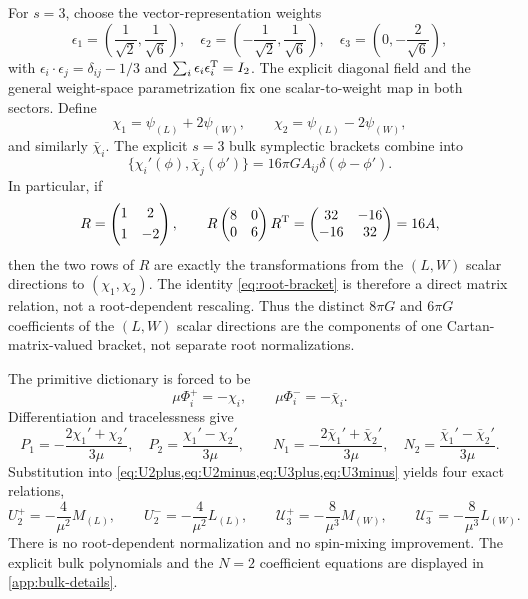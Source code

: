 \documentclass[11pt,a4paper]{article}
\numberwithin{equation}{section}
\theoremstyle{remark}
\newcommand{\cU}{\mathcal U}
\begin{document}
For $s=3$, choose the vector-representation weights
\begin{equation}
 \epsilon_1=\left(\frac1{\sqrt2},\frac1{\sqrt6}\right),\quad
 \epsilon_2=\left(-\frac1{\sqrt2},\frac1{\sqrt6}\right),\quad
 \epsilon_3=\left(0,-\frac2{\sqrt6}\right),
 \label{eq:A2-weights}
\end{equation}
with $\epsilon_i\cdot\epsilon_j=\delta_{ij}-1/3$ and
$\sum_i\epsilon_i\epsilon_i^{\rm T}=I_2$.  The explicit diagonal field and the general
weight-space parametrization fix one scalar-to-weight map in both sectors.  Define
\begin{equation}
 \chi_1=\psi_{(L)}+2\psi_{(W)},\qquad
 \chi_2=\psi_{(L)}-2\psi_{(W)},
 \label{eq:root-variables}
\end{equation}
and similarly $\bar\chi_i$.  The explicit $s=3$ bulk symplectic brackets combine into
\begin{equation}
 \{\chi_i'(\phi),\bar\chi_j(\phi')\}
 =16\pi G A_{ij}\delta(\phi-\phi').
 \label{eq:root-bracket}
\end{equation}
In particular, if
\begin{equation}
 R=\begin{pmatrix}1&2\\[1mm]1&-2\end{pmatrix},
 \qquad
 R\begin{pmatrix}8&0\\0&6\end{pmatrix}R^{\rm T}
 =\begin{pmatrix}32&-16\\-16&32\end{pmatrix}=16A,
 \label{eq:root-bracket-matrix}
\end{equation}
then the two rows of $R$ are exactly the transformations from the $(L,W)$ scalar directions
to $(\chi_1,\chi_2)$.  The identity \cref{eq:root-bracket} is therefore a direct matrix relation,
not a root-dependent rescaling.
Thus the distinct $8\pi G$ and $6\pi G$ coefficients of the $(L,W)$ scalar directions are
the components of one Cartan-matrix-valued bracket, not separate root normalizations.

The primitive dictionary is forced to be
\begin{equation}
 \mu\Phi_i^+=-\chi_i,\qquad \mu\Phi_i^-=-\bar\chi_i.
 \label{eq:A2-primitives}
\end{equation}
Differentiation and tracelessness give
\begin{equation}
 P_1=-\frac{2\chi_1'+\chi_2'}{3\mu},\quad
 P_2=\frac{\chi_1'-\chi_2'}{3\mu},\qquad
 N_1=-\frac{2\bar\chi_1'+\bar\chi_2'}{3\mu},\quad
 N_2=\frac{\bar\chi_1'-\bar\chi_2'}{3\mu}.
 \label{eq:root-current-map}
\end{equation}
Substitution into \cref{eq:U2plus,eq:U2minus,eq:U3plus,eq:U3minus} yields four exact
relations,
\begin{equation}
 U_2^+=-\frac4{\mu^2}M_{(L)},\qquad
 U_2^-=-\frac4{\mu^2}L_{(L)},\qquad
 \cU_3^+=-\frac8{\mu^3}M_{(W)},\qquad
 \cU_3^-=-\frac8{\mu^3}L_{(W)}.
 \label{eq:four-miura-identities}
\end{equation}
There is no root-dependent normalization and no spin-mixing improvement.  The explicit bulk
polynomials and the $N=2$ coefficient equations are displayed in
\cref{app:bulk-details}.
\end{document}
